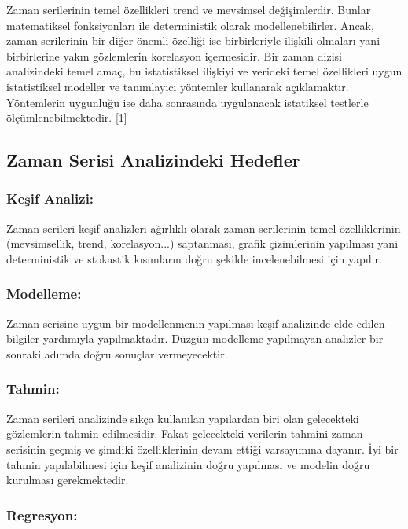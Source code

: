 \documentclass[11pt]{article}
\begin{document}
Zaman serilerinin temel özellikleri trend ve mevsimsel değişimlerdir.
Bunlar matematiksel fonksiyonları ile deterministik olarak
modellenebilirler. Ancak, zaman serilerinin bir diğer önemli özelliği
ise birbirleriyle ilişkili olmaları yani birbirlerine yakın gözlemlerin
korelasyon içermesidir. Bir zaman dizisi analizindeki temel amaç, bu
istatistiksel ilişkiyi ve verideki temel özellikleri uygun istatistiksel
modeller ve tanımlayıcı yöntemler kullanarak açıklamaktır. Yöntemlerin
uygunluğu ise daha sonrasında uygulanacak istatiksel testlerle
ölçümlenebilmektedir. {[}1{]}

\subsection{Zaman Serisi Analizindeki
Hedefler}\label{zaman-serisi-analizindeki-hedefler}

\subsubsection{Keşif Analizi:}\label{keux15fif-analizi}

Zaman serileri keşif analizleri ağırlıklı olarak zaman serilerinin temel
özelliklerinin (mevsimsellik, trend, korelasyon...) saptanması, grafik
çizimlerinin yapılması yani deterministik ve stokastik kısımların doğru
şekilde incelenebilmesi için yapılır.

\subsubsection{Modelleme:}\label{modelleme}

Zaman serisine uygun bir modellenmenin yapılması keşif analizinde elde
edilen bilgiler yardımıyla yapılmaktadır. Düzgün modelleme yapılmayan
analizler bir sonraki adımda doğru sonuçlar vermeyecektir.

\subsubsection{Tahmin:}\label{tahmin}

Zaman serileri analizinde sıkça kullanılan yapılardan biri olan
gelecekteki gözlemlerin tahmin edilmesidir. Fakat gelecekteki verilerin
tahmini zaman serisinin geçmiş ve şimdiki özelliklerinin devam ettiği
varsayımına dayanır. İyi bir tahmin yapılabilmesi için keşif analizinin
doğru yapılması ve modelin doğru kurulması gerekmektedir.

\subsubsection{Regresyon:}\label{regresyon}
\end{document}
